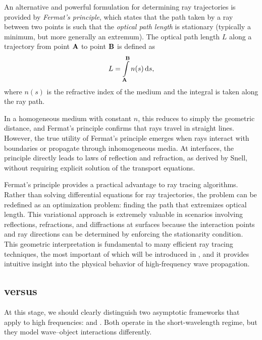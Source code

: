 An alternative and powerful formulation for determining ray trajectories is provided by \emph{Fermat's principle}, which states that the path taken by a ray between two points is such that the \emph{optical path length} is stationary (typically a minimum, but more generally an extremum). The optical path length $L$ along a trajectory from point $\mathbf{A}$ to point $\mathbf{B}$ is defined as
\begin{equation}
  L = \int\limits_{\mathbf{A}}^{\mathbf{B}} n(s)\,\mathrm{d}s,
\end{equation}
where $n(s)$ is the refractive index of the medium and the integral is taken along the ray path.

In a homogeneous medium with constant $n$, this reduces to simply the geometric distance, and Fermat's principle confirms that rays travel in straight lines. However, the true utility of Fermat's principle emerges when rays interact with boundaries or propagate through inhomogeneous media. At interfaces, the principle directly leads to laws of reflection and refraction, as derived by Snell, without requiring explicit solution of the transport equations.

Fermat's principle provides a practical advantage to ray tracing algorithms. Rather than solving differential equations for ray trajectories, the problem can be redefined as an optimization problem: finding the path that extremizes optical length. This variational approach is extremely valuable in scenarios involving reflections, refractions, and diffractions at surfaces because the interaction points and ray directions can be determined by enforcing the stationarity condition. This geometric interpretation is fundamental to many efficient ray tracing techniques, the most important of which will be introduced in , and it provides intuitive insight into the physical behavior of high-frequency wave propagation.

\subsection{\texorpdfstring{}{Geometrical Optics} versus \texorpdfstring{}{Physical Optics}}\label{sec:go_vs_po}

At this stage, we should clearly distinguish two asymptotic frameworks that apply to high frequencies:  and . Both operate in the short-\gls{wavelength} regime, but they model wave--object interactions differently.

